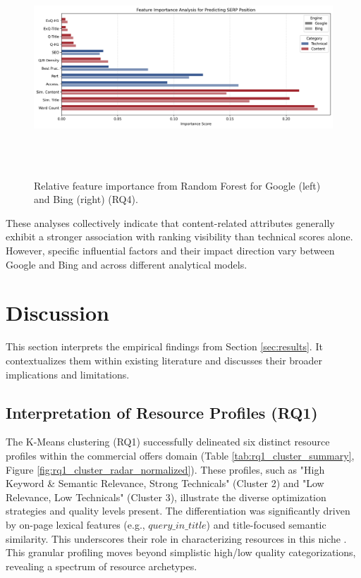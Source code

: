 \documentclass[a4paper,fleqn]{cas-sc}
\begin{document}
\begin{figure}[htbp!]
    \centering
    \includegraphics[width=1\linewidth]{figs/rq4_feature_importance_combined.png}
    \caption{Relative feature importance from Random Forest for Google (left) and Bing (right) (RQ4).}
    \label{fig:rq4_feature_importance_combined}
\end{figure}

These analyses collectively indicate that content-related attributes generally exhibit a stronger association with ranking visibility than technical scores alone. However, specific influential factors and their impact direction vary between Google and Bing and across different analytical models.

\section{Discussion}
\label{sec:discussion}
This section interprets the empirical findings from Section \ref{sec:results}. It contextualizes them within existing literature and discusses their broader implications and limitations.

\subsection{Interpretation of Resource Profiles (RQ1)}
\label{subsec:discussion_rq1}
The K-Means clustering (RQ1) successfully delineated six distinct resource profiles within the commercial offers domain (Table \ref{tab:rq1_cluster_summary}, Figure \ref{fig:rq1_cluster_radar_normalized}). These profiles, such as "High Keyword \& Semantic Relevance, Strong Technicals" (Cluster 2) and "Low Relevance, Low Technicals" (Cluster 3), illustrate the diverse optimization strategies and quality levels present. The differentiation was significantly driven by on-page lexical features (e.g., $query\_in\_title$) and title-focused semantic similarity. This underscores their role in characterizing resources in this niche \citep{Yu2024}. This granular profiling moves beyond simplistic high/low quality categorizations, revealing a spectrum of resource archetypes.
\end{document}
